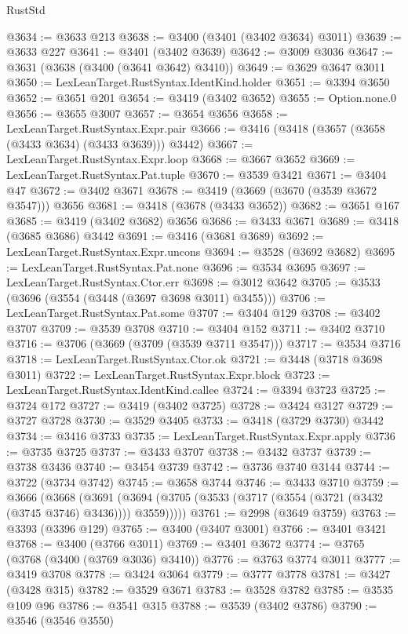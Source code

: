 \begin{lexlean}{RustStd}
\begin{coremodule}
@3634 := @3633 @213
@3638 := @3400 (@3401 (@3402 @3634) @3011)
@3639 := @3633 @227
@3641 := @3401 (@3402 @3639)
@3642 := @3009 @3036
@3647 := @3631 (@3638 (@3400 (@3641 @3642) @3410))
@3649 := @3629 @3647 @3011
@3650 := LexLeanTarget.RustSyntax.IdentKind.holder
@3651 := @3394 @3650
@3652 := @3651 @201
@3654 := @3419 (@3402 @3652)
@3655 := Option.none.{0}
@3656 := @3655 @3007
@3657 := @3654 @3656
@3658 := LexLeanTarget.RustSyntax.Expr.pair
@3666 := @3416 (@3418 (@3657 (@3658 (@3433 @3634) (@3433 @3639))) @3442)
@3667 := LexLeanTarget.RustSyntax.Expr.loop
@3668 := @3667 @3652
@3669 := LexLeanTarget.RustSyntax.Pat.tuple
@3670 := @3539 @3421
@3671 := @3404 @47
@3672 := @3402 @3671
@3678 := @3419 (@3669 (@3670 (@3539 @3672 @3547))) @3656
@3681 := @3418 (@3678 (@3433 @3652))
@3682 := @3651 @167
@3685 := @3419 (@3402 @3682) @3656
@3686 := @3433 @3671
@3689 := @3418 (@3685 @3686) @3442
@3691 := @3416 (@3681 @3689)
@3692 := LexLeanTarget.RustSyntax.Expr.uncons
@3694 := @3528 (@3692 @3682)
@3695 := LexLeanTarget.RustSyntax.Pat.none
@3696 := @3534 @3695
@3697 := LexLeanTarget.RustSyntax.Ctor.err
@3698 := @3012 @3642
@3705 := @3533 (@3696 (@3554 (@3448 (@3697 @3698 @3011) @3455)))
@3706 := LexLeanTarget.RustSyntax.Pat.some
@3707 := @3404 @129
@3708 := @3402 @3707
@3709 := @3539 @3708
@3710 := @3404 @152
@3711 := @3402 @3710
@3716 := @3706 (@3669 (@3709 (@3539 @3711 @3547)))
@3717 := @3534 @3716
@3718 := LexLeanTarget.RustSyntax.Ctor.ok
@3721 := @3448 (@3718 @3698 @3011)
@3722 := LexLeanTarget.RustSyntax.Expr.block
@3723 := LexLeanTarget.RustSyntax.IdentKind.callee
@3724 := @3394 @3723
@3725 := @3724 @172
@3727 := @3419 (@3402 @3725)
@3728 := @3424 @3127
@3729 := @3727 @3728
@3730 := @3529 @3405
@3733 := @3418 (@3729 @3730) @3442
@3734 := @3416 @3733
@3735 := LexLeanTarget.RustSyntax.Expr.apply
@3736 := @3735 @3725
@3737 := @3433 @3707
@3738 := @3432 @3737
@3739 := @3738 @3436
@3740 := @3454 @3739
@3742 := @3736 @3740 @3144
@3744 := @3722 (@3734 @3742)
@3745 := @3658 @3744
@3746 := @3433 @3710
@3759 := @3666
    (@3668
      (@3691 (@3694 (@3705 (@3533 (@3717 (@3554 (@3721 (@3432 (@3745 @3746) @3436)))) @3559)))))
@3761 := @2998 (@3649 @3759)
@3763 := @3393 (@3396 @129)
@3765 := @3400 (@3407 @3001)
@3766 := @3401 @3421
@3768 := @3400 (@3766 @3011)
@3769 := @3401 @3672
@3774 := @3765 (@3768 (@3400 (@3769 @3036) @3410))
@3776 := @3763 @3774 @3011
@3777 := @3419 @3708
@3778 := @3424 @3064
@3779 := @3777 @3778
@3781 := @3427 (@3428 @315)
@3782 := @3529 @3671
@3783 := @3528 @3782
@3785 := @3535 @109 @96
@3786 := @3541 @315
@3788 := @3539 (@3402 @3786)
@3790 := @3546 (@3546 @3550)

\end{coremodule}
\end{lexlean}
